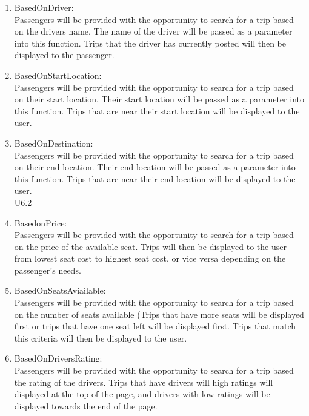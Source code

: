 \documentclass[hidelinks, 12pt, a4paper]{article}
\begin{document}
\begin{enumerate}[label=U1.\arabic*]

      \item BasedOnDriver:\\
            Passengers will be provided with the opportunity to search for a trip based on the drivers name. The name of the driver will be passed as a parameter into this function. Trips that the driver has currently posted will then be displayed to the passenger.\\


      \item BasedOnStartLocation:\\
            Passengers will be provided with the opportunity to search for a trip based on their start location. Their start location  will be passed as a parameter into this function. Trips that are near their start location will be displayed to the user.\\

      \item BasedOnDestination:\\
            Passengers will be provided with the opportunity to search for a trip based on their end  location. Their end  location  will be passed as a parameter into this function. Trips that are near their end location will be displayed to the user.\\
            U6.2

      \item BasedonPrice: \\
            Passengers will be provided with the opportunity to search for a trip based on the price of the available seat. Trips will then be displayed to the user from lowest seat cost to highest seat cost, or vice versa depending on the passenger’s needs.\\

      \item BasedOnSeatsAviailable:\\
            Passengers will be provided with the opportunity to search for a trip based on the number of seats available (Trips that have more seats will be displayed first or trips that have one seat left will be displayed first. Trips that match this criteria will then be displayed to the user. \\

      \item BasedOnDriversRating:\\
            Passengers will be provided with the opportunity to search for a trip based the rating of the drivers. Trips that have drivers will high ratings will displayed at the top of the page, and drivers with low ratings will be displayed towards the end of the page.\\


\end{enumerate}
\end{document}

